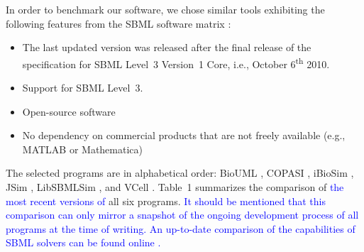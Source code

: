 \documentclass[10pt]{bmc_article}
\newenvironment{bmcformat}{\fussy\setboolean{publ}{true}}{\fussy}
\newcommand{\COR}[1]                      {\textcolor{blue}{#1}}
\newcommand{\TODO}[1]                     {\textcolor{red}{#1}}
\begin{document}
\begin{bmcformat}
In order to benchmark our software, we chose similar tools exhibiting the
following features from the \acs{SBML} software
matrix \TODO{\cite{SBMLsoftwareMatrix2012}}:
%
%
\begin{itemize}
  \item The last updated version was released after the final release of
  the specification for \acs{SBML} Level~3 Version~1 Core, i.e., October
  6\textsuperscript{th} 2010.
  \item Support for \acs{SBML} Level~3.
  \item Open-source software
  \item No dependency on commercial products that are not freely available
  (e.g., MATLAB\texttrademark{} or Mathematica\texttrademark)
\end{itemize}
The selected programs are in alphabetical order:
BioUML \cite{Kolpakov2011, Kolpakov2006}, COPASI \cite{Hoops2006}, 
iBioSim \cite{Myers2009, Madsen2012}, JSim \cite{Raymond2003}, LibSBMLSim 
\cite{Takizawa2013, Funahashi2012}, and VCell \cite{Moraru2008}.
Table~1 summarizes the comparison of \COR{the most recent versions of} all six
programs.
\COR{It should be mentioned that this comparison can only mirror a snapshot of
the ongoing development process of all programs at the time of writing.
An up-to-date comparison of the capabilities of SBML solvers can be found online
\cite{Bergmann2013}.}



\end{bmcformat}
\end{document}
